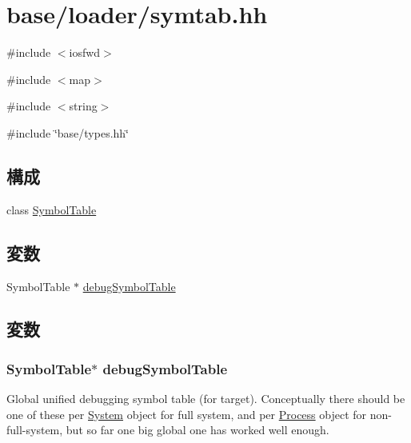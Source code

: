 \hypertarget{symtab_8hh}{
\section{base/loader/symtab.hh}
\label{symtab_8hh}
}
{\ttfamily \#include $<$iosfwd$>$}\par
{\ttfamily \#include $<$map$>$}\par
{\ttfamily \#include $<$string$>$}\par
{\ttfamily \#include \char`\"{}base/types.hh\char`\"{}}\par
\subsection*{構成}
\begin{DoxyCompactItemize}
\item 
class \hyperlink{classSymbolTable}{SymbolTable}
\end{DoxyCompactItemize}
\subsection*{変数}
\begin{DoxyCompactItemize}
\item 
SymbolTable $\ast$ \hyperlink{symtab_8hh_abece40c619c717eea028f1339f0c31b9}{debugSymbolTable}
\end{DoxyCompactItemize}


\subsection{変数}
\hypertarget{symtab_8hh_abece40c619c717eea028f1339f0c31b9}{
\subsubsection[{debugSymbolTable}]{\setlength{\rightskip}{0pt plus 5cm}SymbolTable$\ast$ {\bf debugSymbolTable}}}
\label{symtab_8hh_abece40c619c717eea028f1339f0c31b9}
Global unified debugging symbol table (for target). Conceptually there should be one of these per \hyperlink{classSystem}{System} object for full system, and per \hyperlink{classProcess}{Process} object for non-\/full-\/system, but so far one big global one has worked well enough. 